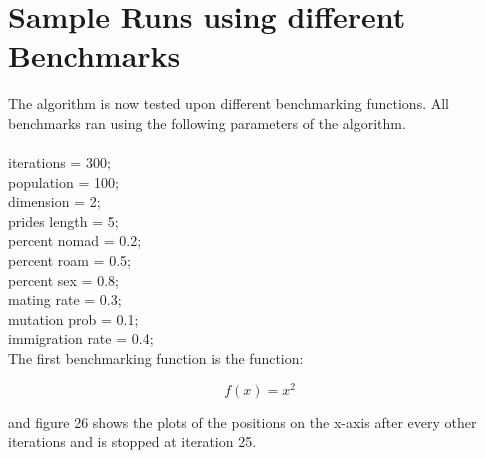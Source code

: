 \section{Sample Runs using different Benchmarks}
The algorithm is now tested upon different benchmarking functions. All benchmarks ran using the following parameters of the algorithm.
\\
\\
iterations = 300;\\

population = 100;\\

dimension = 2;\\

prides length = 5;\\

percent nomad = 0.2;\\
percent roam = 0.5;\\
percent sex = 0.8;\\

mating rate = 0.3;\\
mutation prob = 0.1;\\

immigration rate = 0.4;\\

The first benchmarking function is the function:

$$
  f(x) = x^2
$$

and figure 26 shows the plots of the positions on the x-axis after every other iterations and is stopped at iteration 25.

